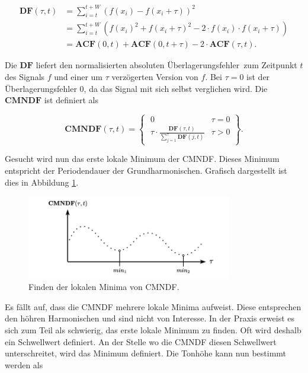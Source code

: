 \begin{equation}
    \begin{aligned}
        \mathbf{DF}(\tau,t)
        &= \sum_{i=t}^{t+W}\left(f(x_i)-f(x_i+\tau)\right)^2 \\
        &= \sum_{i=t}^{t+W}\left(f(x_i)^2+f(x_i+\tau)^2-2 \cdot f(x_i) \cdot f(x_i + \tau)\right) \\
        &= \mathbf{ACF}(0,t)+\mathbf{ACF}(0,t+\tau)-2\cdot \mathbf{ACF}(\tau,t).
    \end{aligned}
\end{equation}

Die $\mathbf{DF}$ liefert den normalisierten absoluten \glqq Überlagerungsfehler\grqq\ zum Zeitpunkt $t$ des Signals $f$ und einer um $\tau$ verzögerten Version von $f$.
Bei $\tau=0$ ist der Überlagerungsfehler 0, da das Signal mit sich selbst verglichen wird.
Die $\mathbf{CMNDF}$ ist definiert als 

\begin{equation}
    \mathbf{CMNDF}(\tau,t)
    =
    \left\{
        \;\begin{array}{ll} 0 & \tau=0 \\
        \tau \cdot \frac{\mathbf{DF}(\tau,t)}{\sum\nolimits_{j=1}^{\tau} \mathbf{DF}(j,t)} & \tau > 0 \end{array}
    \right\}.
\end{equation}


Gesucht wird nun das erste lokale Minimum der CMNDF.
Dieses Minimum entspricht der Periodendauer der Grundharmonischen.
Grafisch dargestellt ist dies in Abbildung \ref{autotune:fig:cmndfMinimum}.

\begin{figure}
	\centering
	\includegraphics[width=0.8\textwidth]{papers/autotune/images/CMNDF_Minimum.pdf}
	\caption{Finden der lokalen Minima von CMNDF.}
    \label{autotune:fig:cmndfMinimum}
\end{figure}


Es fällt auf, dass die CMNDF mehrere lokale Minima aufweist.
Diese entsprechen den höhren Harmonischen und sind nicht von Interesse.
In der Praxis erweist es sich zum Teil als schwierig, das erste lokale Minimum zu finden.
Oft wird deshalb ein Schwellwert definiert.
An der Stelle wo die CMNDF diesen Schwellwert unterschreitet, wird das Minimum definiert.
Die Tonhöhe kann nun bestimmt werden als

